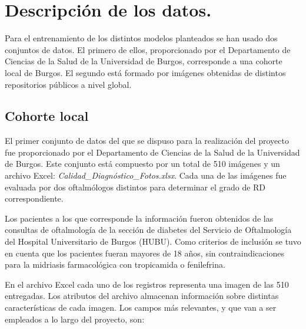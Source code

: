  \label{Met}

\titlespacing{\section}{0pt}{0.25cm}{0.15cm}
\section{Descripción de los datos.}

Para el entrenamiento de los distintos modelos planteados se han usado dos conjuntos de datos. El primero de ellos, proporcionado por el Departamento de Ciencias de la Salud de la Universidad de Burgos, corresponde a una cohorte local de Burgos. El segundo está formado por imágenes obtenidas de distintos repositorios públicos a nivel global.

\subsection{Cohorte local}

El primer conjunto de datos del que se dispuso para la realización del proyecto fue proporcionado por el Departamento de Ciencias de la Salud de la Universidad de Burgos. Este conjunto está compuesto por un total de 510 imágenes y un archivo Excel: \textit{Calidad\_Diagnóstico\_Fotos.xlsx}. Cada una de las imágenes fue evaluada por dos oftalmólogos distintos para determinar el grado de RD correspondiente.

Los pacientes a los que corresponde la información fueron obtenidos de las consultas de oftalmología de la sección de diabetes del Servicio de Oftalmología del Hospital Universitario de Burgos (HUBU). Como criterios de inclusión se tuvo en cuenta que los pacientes fueran mayores de 18 años, sin contraindicaciones para la midriasis farmacológica con tropicamida o fenilefrina.

En el archivo Excel cada uno de los registros representa una imagen de las 510 entregadas. Los atributos del archivo almacenan información sobre distintas características de cada imagen. Los campos más relevantes, y que van a ser empleados a lo largo del proyecto, son:

